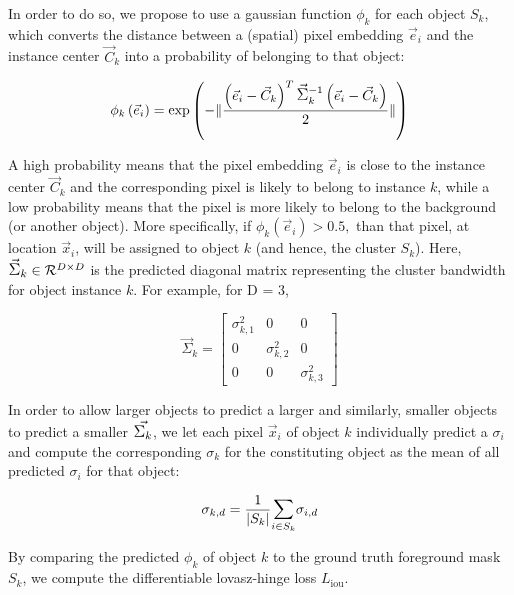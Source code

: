 \documentclass{midl} %
\begin{document}
In order to do so, we propose to use a gaussian function $\phi_{k}$ for each object $S_{k}$, which converts the distance between a (spatial) pixel embedding $\vec{e}_{i}$ and the instance center $\vec{C}_{k}$ into a probability of belonging to that object:

\begin{equation}
\phi_{k} \left( \vec{e}_{i} \right) = \exp \left( -\lVert \frac{ \left( \vec{e}_{i} - \vec{C}_{k} \right)^{T} \mathlarger{\mathlarger{\vec{\Sigma}}}_{k}^{-1} \left( \vec{e}_{i} - \vec{C}_{k} \right)}{2} \rVert \right)   \label{eqgauss}
\end{equation}

A high probability means that the pixel embedding $\vec{e}_{i}$ is close to the instance center  $\vec{C}_{k}$ and the corresponding pixel is likely to belong to instance $k$, while a low probability means that the pixel is more likely to belong to the background (or another object). More specifically, if $\phi_{k}(\vec{e}_{i})>0.5,$ than that pixel, at location $\vec{x}_{i}$, will be assigned to object $k$ (and hence, the cluster $S_{k}$). Here, $\mathlarger{\mathlarger{\vec{\Sigma}_{k}}} \in \mathcal{R}^{D \times D}$ is the predicted diagonal matrix representing the cluster bandwidth for object instance $k$. For example, for D = 3, 

\begin{equation}
    \vec{\Sigma}_{k} = \begin{bmatrix}
    \sigma^{2}_{k, 1} & 0 & 0 \\
    0 & \sigma^{2}_{k, 2} & 0 \\
    0 & 0 & \sigma^{2}_{k, 3}
    \end{bmatrix}
\end{equation}

In order to allow larger objects to predict a larger  and similarly, smaller objects to predict a smaller $\mathlarger{\mathlarger{\vec{\Sigma_{k}}}}$, we let each pixel $\vec{x}_{i}$ of object $k$ individually predict a $\sigma_{i}$ and compute the corresponding $\sigma_{k}$ for the constituting object as the mean of all predicted $\sigma_{i}$ for that object:

\begin{equation}
    \sigma_{k, d} = \frac{1}{\vert S_{k} \vert} \mathlarger{\sum}_{i \in S_{k}} \sigma_{i, d}
\end{equation}

By comparing the predicted $\phi_{k}$ of object $k$ to the ground truth foreground mask $S_{k}$, we compute the differentiable lovasz-hinge loss $L_{\text{iou}}$.
\end{document}
